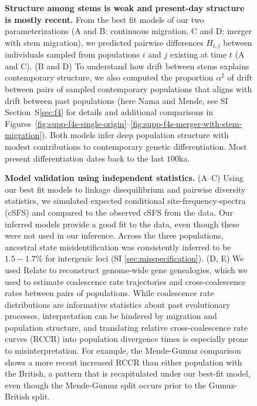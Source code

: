 \documentclass[]{article}
\begin{document}
\begin{figure}[t!]
    \centering
    \caption{
        \textbf{Structure among stems is weak and present-day structure is mostly recent.}
        From the best fit models of our two parameterizations (A and B:
        continuous migration, C and D: merger with stem migration),
        we predicted pairwise differences $H_{i,j}$ between individuals
        sampled from populations $i$ and $j$ existing at time $t$ (A and C).
        (B and D) To understand how drift between stems explains contemporary structure, 
        we also computed the proportion $\alpha^2$ of drift between pairs of
        sampled contemporary
        populations that aligns with drift between past populations
        (here Nama and Mende, see SI Section~S\ref{sec:f4}
        for details and additional comparisons in
        Figures~\ref{fig:supp-f4s-single-origin}--\ref{fig:supp-f4s-merger-with-stem-migration}).
        Both models infer deep population structure with modest contributions to
        contemporary genetic differentiation.
        Most present differentiation dates back to the last $100$ka.
    }
    \label{fig:predictions}
\end{figure}

\begin{figure}[t!]
    \centering
    \caption{
        \textbf{Model validation using independent statistics.} (A--C) Using
        our best fit models to linkage disequilibrium and pairwise diversity statistics,
        we simulated expected conditional site-frequency-spectra (cSFS) and
        compared to the observed cSFS from the data. Our inferred models
        provide a good fit to the data, even though these were not used in our
        inference. Across the three populations, ancestral state
        misidentification was consistently inferred to be $1.5-1.7\%$ for
        intergenic loci (SI \ref{sec:misspecification}). (D, E) We used Relate
        \citep{Speidel2019-nj} to reconstruct genome-wide gene genealogies,
        which we used to estimate coalescence rate trajectories
        and cross-coalescence rates between pairs of populations. While
        coalescence rate distributions are informative statistics about past
        evolutionary processes, interpretation can be hindered by migration and
        population structure, and translating relative cross-coalescence rate
        curves (RCCR) into population divergence times is especially prone
        to misinterpretation. For example, the Mende-Gumuz comparison shows
        a more recent increased RCCR than either population with the British,
        a pattern that is recapitulated under our best-fit model, even though
        the Mende-Gumuz split occurs prior to the Gumuz-British split.
    }
    \label{fig:validation}
\end{figure}
\end{document}
